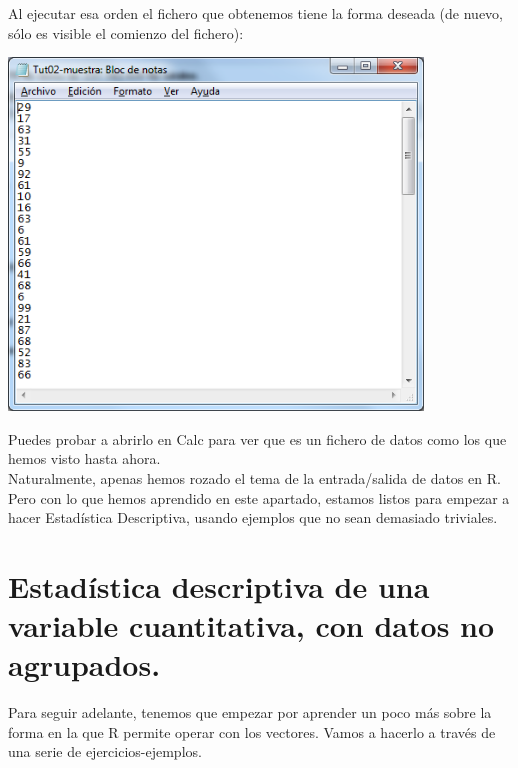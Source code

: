 \documentclass[10pt,a4paper]{article}\usepackage[]{graphicx}\usepackage[]{color}
\begin{document}
Al ejecutar esa orden  
el fichero que obtenemos tiene la forma deseada (de nuevo, sólo es visible el comienzo del fichero):
    \begin{center}
    \includegraphics[width=11cm]{../fig/Tut02-14.png}
    \end{center}
Puedes probar a abrirlo en Calc para ver que es un fichero de datos como los que hemos visto hasta ahora.\\

Naturalmente, apenas hemos rozado el tema de la entrada/salida de datos en R. Pero con lo que hemos aprendido en este apartado, estamos listos para empezar a hacer Estadística Descriptiva, usando ejemplos que no sean demasiado triviales.

\section{Estadística descriptiva de una variable cuantitativa, con datos no agrupados.}
\label{tut03:sec:EstadisticaDescriptivaVariableCuantitativaConR}

Para seguir adelante, tenemos que empezar por aprender un poco más sobre la forma en la que R permite operar con los vectores. Vamos a hacerlo a través de una serie de ejercicios-ejemplos.
\end{document}
